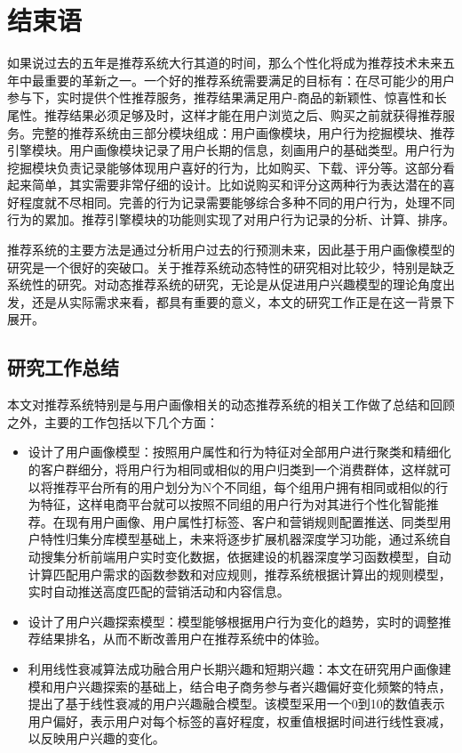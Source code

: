 
\chapter{结束语}
  如果说过去的五年是推荐系统大行其道的时间，那么个性化将成为推荐技术未来五年中最重要的革新之一。一个好的推荐系统需要满足的目标有：在尽可能少的用户参与下，实时提供个性推荐服务，推荐结果满足用户-商品的新颖性、惊喜性和长尾性。推荐结果必须足够及时，这样才能在用户浏览之后、购买之前就获得推荐服务。完整的推荐系统由三部分模块组成：用户画像模块，用户行为挖掘模块、推荐引擎模块。用户画像模块记录了用户长期的信息，刻画用户的基础类型。用户行为挖掘模块负责记录能够体现用户喜好的行为，比如购买、下载、评分等。这部分看起来简单，其实需要非常仔细的设计。比如说购买和评分这两种行为表达潜在的喜好程度就不尽相同。完善的行为记录需要能够综合多种不同的用户行为，处理不同行为的累加。推荐引擎模块的功能则实现了对用户行为记录的分析、计算、排序。

  推荐系统的主要方法是通过分析用户过去的行预测未来，因此基于用户画像模型的研究是一个很好的突破口。关于推荐系统动态特性的研究相对比较少，特别是缺乏系统性的研究。对动态推荐系统的研究，无论是从促进用户兴趣模型的理论角度出发，还是从实际需求来看，都具有重要的意义，本文的研究工作正是在这一背景下展开。

  \section{研究工作总结}
    本文对推荐系统特别是与用户画像相关的动态推荐系统的相关工作做了总结和回顾之外，主要的工作包括以下几个方面：
    \begin{itemize}
      \item 设计了用户画像模型：按照用户属性和行为特征对全部用户进行聚类和精细化的客户群细分，将用户行为相同或相似的用户归类到一个消费群体，这样就可以将推荐平台所有的用户划分为N个不同组，每个组用户拥有相同或相似的行为特征，这样电商平台就可以按照不同组的用户行为对其进行个性化智能推荐。在现有用户画像、用户属性打标签、客户和营销规则配置推送、同类型用户特性归集分库模型基础上，未来将逐步扩展机器深度学习功能，通过系统自动搜集分析前端用户实时变化数据，依据建设的机器深度学习函数模型，自动计算匹配用户需求的函数参数和对应规则，推荐系统根据计算出的规则模型，实时自动推送高度匹配的营销活动和内容信息。
      \item 设计了用户兴趣探索模型：模型能够根据用户行为变化的趋势，实时的调整推荐结果排名，从而不断改善用户在推荐系统中的体验。
      \item 利用线性衰减算法成功融合用户长期兴趣和短期兴趣：本文在研究用户画像建模和用户兴趣探索的基础上，结合电子商务参与者兴趣偏好变化频繁的特点，提出了基于线性衰减的用户兴趣融合模型。该模型采用一个0到10的数值表示用户偏好，表示用户对每个标签的喜好程度，权重值根据时间进行线性衰减，以反映用户兴趣的变化。
    \end{itemize}

